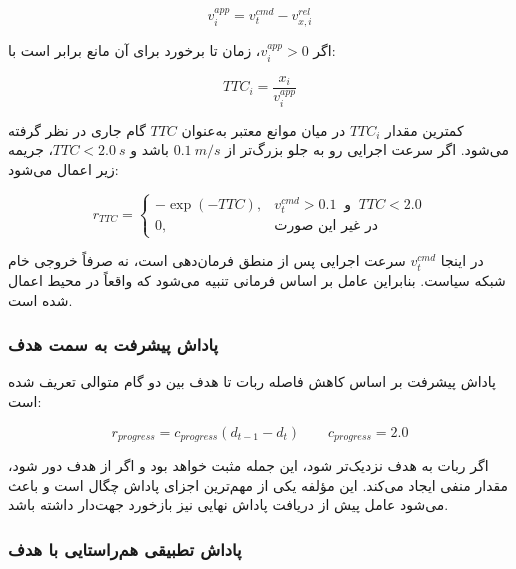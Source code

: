 \begin{equation}
	v^{app}_i = v^{cmd}_t - v^{rel}_{x,i}
	\label{eq:approach_speed_final}
\end{equation}

اگر \(v^{app}_i>0\)، زمان تا برخورد برای آن مانع برابر است با:

\begin{equation}
	TTC_i = \frac{x_i}{v^{app}_i}
	\label{eq:ttc_single_final}
\end{equation}

کمترین مقدار \(TTC_i\) در میان موانع معتبر به‌عنوان \(TTC\) گام جاری در نظر گرفته می‌شود. اگر سرعت اجرایی رو به جلو بزرگ‌تر از \(0.1~m/s\) باشد و \(TTC<2.0~s\)، جریمه زیر اعمال می‌شود:

\begin{equation}
	r_{TTC}=
	\begin{cases}
		-\exp(-TTC), & v^{cmd}_t>0.1 \;\; \text{و} \;\; TTC<2.0\\
		0, & \text{در غیر این صورت}
	\end{cases}
	\label{eq:ttc_reward_term_final}
\end{equation}

در اینجا \(v^{cmd}_t\) سرعت اجرایی پس از منطق فرمان‌دهی است، نه صرفاً خروجی خام شبکه سیاست. بنابراین عامل بر اساس فرمانی تنبیه می‌شود که واقعاً در محیط اعمال شده است.

\subsubsection{پاداش پیشرفت به سمت هدف}
\label{subsubsec:progress_reward_final}

پاداش پیشرفت بر اساس کاهش فاصله ربات تا هدف بین دو گام متوالی تعریف شده است:

\begin{equation}
	r_{progress} = c_{progress}(d_{t-1}-d_t)
	\qquad
	c_{progress}=2.0
	\label{eq:progress_reward_final}
\end{equation}

اگر ربات به هدف نزدیک‌تر شود، این جمله مثبت خواهد بود و اگر از هدف دور شود، مقدار منفی ایجاد می‌کند. این مؤلفه یکی از مهم‌ترین اجزای پاداش چگال است و باعث می‌شود عامل پیش از دریافت پاداش نهایی نیز بازخورد جهت‌دار داشته باشد.

\subsubsection{پاداش تطبیقی هم‌راستایی با هدف}
\label{subsubsec:adaptive_heading_reward_final}

